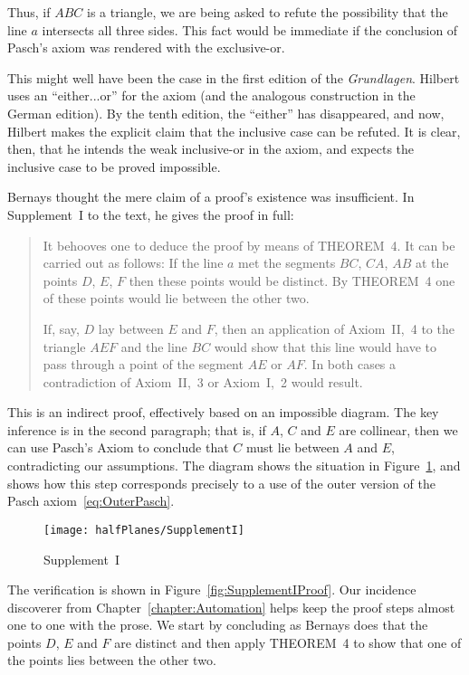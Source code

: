 \label{sec:PaschInclusiveOr}Thus, if $ABC$ is a triangle, we are being asked to refute the possibility that the line $a$ intersects all three sides. This fact would be immediate if the conclusion of Pasch's axiom was rendered with the exclusive-or. 

This might well have been the case in the first edition of the \emph{Grundlagen}. Hilbert uses an ``either...or'' for the axiom (and the analogous construction in the German edition). By the tenth edition, the ``either'' has disappeared, and now, Hilbert makes the explicit claim that the inclusive case can be refuted. It is clear, then, that he intends the weak inclusive-or in the axiom, and expects the inclusive case to be proved impossible.

Bernays thought the mere claim of a proof's existence was insufficient. In Supplement~I to the text, he gives the proof in full:

\begin{quotation}\label{sec:SupplementI}
It behooves one to deduce the proof by means of THEOREM~4. It can be carried out as follows: If the line $a$ met the segments $BC$, $CA$, $AB$ at the points $D$, $E$, $F$ then these points would be distinct. By THEOREM~4 one of these points would lie between the other two.

If, say, $D$ lay between $E$ and $F$, then an application of Axiom~II,~4 to the triangle $AEF$ and the line $BC$ would show that this line would have to pass through a point of the segment $AE$ or $AF$. In both cases a contradiction of Axiom~II,~3 or Axiom~I,~2 would result.
\end{quotation}

This is an indirect proof, effectively based on an impossible diagram. The key inference is in the second paragraph; that is, if $A$, $C$ and $E$ are collinear, then we can use Pasch's Axiom to conclude that $C$ must lie between $A$ and $E$, contradicting our assumptions. The diagram shows the situation in Figure~\ref{fig:SupplementI}, and shows how this step corresponds precisely to a use of the outer version of the Pasch axiom~\eqref{eq:OuterPasch}.

\begin{figure}
  \centering\texttt{[image: halfPlanes/SupplementI]}
  \caption{Supplement~I}
  \label{fig:SupplementI}
\end{figure}

The verification is shown in Figure~\ref{fig:SupplementIProof}. Our incidence discoverer from Chapter~\ref{chapter:Automation} helps keep the proof steps almost one to one with the prose. We start by concluding as Bernays does that the points $D$, $E$ and $F$ are distinct and then apply THEOREM~4 to show that one of the points lies between the other two.

